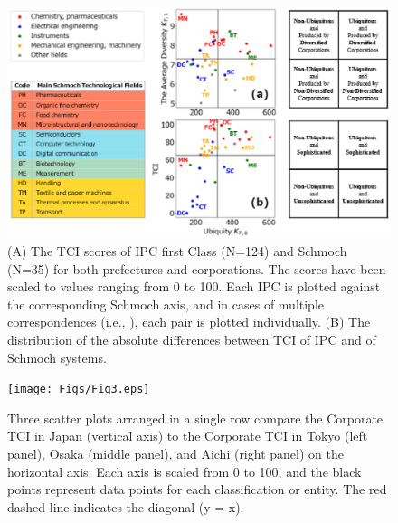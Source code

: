 \begin{figure}[ht]
    \centering
    \includegraphics[scale=0.65]{Figs/Fig2.eps}
    \caption{(A) The TCI scores of IPC first Class (N=124) and Schmoch (N=35) for both prefectures and corporations. The scores have been scaled to values ranging from 0 to 100. Each IPC is plotted against the corresponding Schmoch axis, and in cases of multiple correspondences (i.e., ), each pair is plotted individually. (B) The distribution of the absolute differences between TCI of IPC and of Schmoch systems.}
    \label{fig:detailtci}
\end{figure}


\begin{figure}[ht]
    \centering
    \texttt{[image: Figs/Fig3.eps]}
    \caption{Three scatter plots arranged in a single row compare the Corporate TCI in Japan (vertical axis) to the Corporate TCI in Tokyo (left panel), Osaka (middle panel), and Aichi (right panel) on the horizontal axis. Each axis is scaled from 0 to 100, and the black points represent data points for each classification or entity. The red dashed line indicates the diagonal (y = x).}
    \label{fig:prefcompare}
\end{figure}
